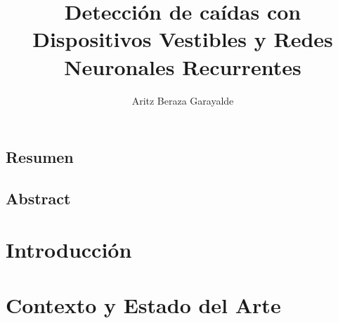\documentclass[11pt,a4paper,spanish]{book}
\title{Detección de caídas con Dispositivos Vestibles y Redes Neuronales Recurrentes}
\author{Aritz Beraza Garayalde}
\date{\currenttime}
\begin{document}



\renewcommand{\listfigurename}{Índice de Ilustraciones}
\renewcommand{\listtablename}{Índice de Tablas}
\renewcommand{\contentsname}{Índice de Contenidos}
\renewcommand{\figurename}{Figura}
\renewcommand{\tablename}{Tabla}
\newcommand{\fullref}[1]{\hyperref[#1]{\autoref{#1}: \textit{\nameref*{#1}}}}
\newcommand{\apartado}[1]{\hyperref[#1]{Apartado~\ref{#1}}}

\maketitle
\frontmatter
\tableofcontents
\listoffigures
\listoftables

\mainmatter

\section*{Resumen}
%



\section*{Abstract}
% 


\chapter{Introducción}\label{chap:intro}


\chapter{Contexto y Estado del Arte}\label{chap:stateofart}

 
\end{document}

